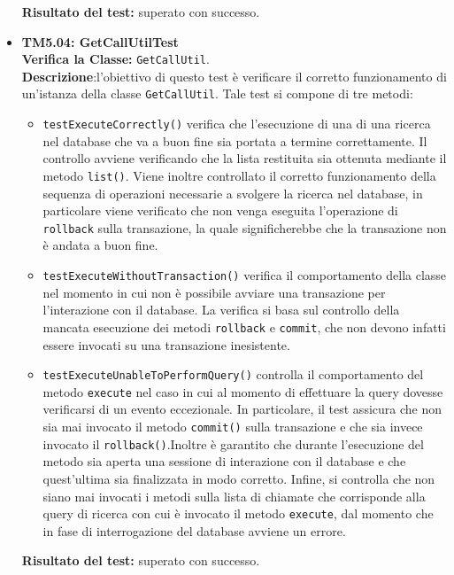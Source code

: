 \begin{itemize}
\begin{itemize}
\end{itemize}
\textbf{Risultato del test:} superato con successo.


\item \textbf{TM5.04: GetCallUtilTest}\\
\textbf{Verifica la Classe:} \texttt{GetCallUtil}.\\
\textbf{Descrizione}:l'obiettivo di questo test è verificare il corretto funzionamento di un'istanza della classe \texttt{GetCallUtil}.
Tale test si compone di tre metodi:
\begin{itemize}
\item \texttt{testExecuteCorrectly()} 
verifica che l'esecuzione di una di una ricerca nel database che va a buon fine  sia portata a termine correttamente. 
Il controllo avviene verificando che la lista restituita sia ottenuta mediante il metodo \texttt{list()}. 
Viene inoltre controllato il corretto funzionamento della sequenza di operazioni necessarie a svolgere la ricerca nel database, in particolare viene verificato che non venga eseguita l'operazione di \texttt{rollback} sulla transazione, la quale significherebbe che la transazione non è andata a buon fine.



\item \texttt{testExecuteWithoutTransaction()}
verifica il comportamento della classe nel momento in cui non è possibile avviare una transazione per l'interazione con il database.
La verifica si basa sul controllo della mancata esecuzione dei metodi \texttt{rollback} e \texttt{commit}, che non devono infatti essere invocati su una transazione inesistente.


\item \texttt{testExecuteUnableToPerformQuery()}
controlla il comportamento del metodo \texttt{execute} nel caso in cui al momento di effettuare la query dovesse verificarsi di un evento eccezionale. In particolare, il test assicura che non sia mai invocato il metodo \texttt{commit()} sulla transazione e che sia invece invocato il \texttt{rollback()}.Inoltre è garantito che durante l'esecuzione del metodo sia aperta una sessione di interazione con il database e che quest'ultima sia finalizzata in modo corretto. Infine, si controlla che non siano mai invocati i metodi sulla lista di chiamate che corrisponde alla query di ricerca con cui è invocato il metodo \texttt{execute}, dal momento che in fase di interrogazione del database avviene un errore.

\end{itemize}
\textbf{Risultato del test:} superato con successo.


\end{itemize}
